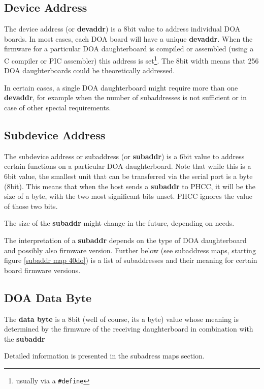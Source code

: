 \documentclass[11pt]{scrartcl}
\begin{document}
\subsection{Device Address}

The device address (or \textbf{devaddr}) is a 8bit value to address 
individual DOA boards. In most cases, each DOA board will have a unique
\textbf{devaddr}. When the firmware for a particular DOA daughterboard 
is compiled or assembled (using a C compiler or PIC assembler) this address
is set\footnote{usually via a \texttt{\#define}}. The 8bit width means that 
256 DOA daughterboards could be theoretically addressed.

In certain cases, a single DOA daughterboard might require more than 
one \textbf{devaddr}, for example when the number of subaddresses is not 
sufficient or in case of other special requirements.

\subsection{Subdevice Address}

The subdevice address or subaddress (or \textbf{subaddr}) is a 6bit value
to address certain functions on a particular DOA daughterboard. Note that while
this is a 6bit value, the smallest unit that can be transferred via the serial port 
is a byte (8bit). This means that when the host sends a \textbf{subaddr} to PHCC,
it will be the size of a byte, with the two most significant bits unset. 
PHCC ignores the value of those two bits.

The size of the \textbf{subaddr} might change in the future, depending on needs.

The interpretation of a \textbf{subaddr} depends on the type of DOA daughterboard
and possibly also firmware version. Further below (see subaddress maps, starting 
figure \ref{subaddr map 40do})
is a list of subaddresses and their meaning for certain board firmware versions.


\subsection{DOA Data Byte}

The \textbf{data byte} is a 8bit (well of course, its a byte) value whose meaning is 
determined by the firmware of the receiving daughterboard in combination with 
the \textbf{subaddr}

Detailed information is presented in the subadress maps section.
\end{document}
